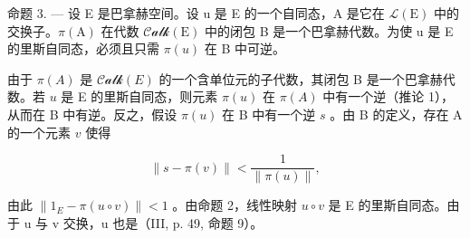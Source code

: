 命题 3. --- 设 E 是巴拿赫空间。设 u 是 E 的一个自同态，A 是它在 \(\mathcal{L}(\mathrm{E})\) 中的交换子。\(\pi(\mathrm{A})\) 在代数 \(\mathcal{Calk}(\mathrm{E})\) 中的闭包 B 是一个巴拿赫代数。为使 u 是 E 的里斯自同态，必须且只需 \(\pi(u)\) 在 B 中可逆。

由于 \(\pi(A)\) 是 \(\mathcal{Calk}(E)\) 的一个含单位元的子代数，其闭包 B 是一个巴拿赫代数。若 \(u\) 是 E 的里斯自同态，则元素 \(\pi(u)\) 在 \(\pi(A)\) 中有一个逆（推论 1），从而在 B 中有逆。反之，假设 \(\pi(u)\) 在 B 中有一个逆 \(s\) 。由 B 的定义，存在 A 的一个元素 \(v\) 使得

\[
\left\| s - \pi (v) \right\| <   \frac {1}{\left\| \pi (u) \right\|},
\]

由此 \(\|1_{E}-\pi(u\circ v)\|<1\) 。由命题 2，线性映射 \(u\circ v\) 是 E 的里斯自同态。由于 u 与 v 交换，u 也是（III, p. 49, 命题 9）。

